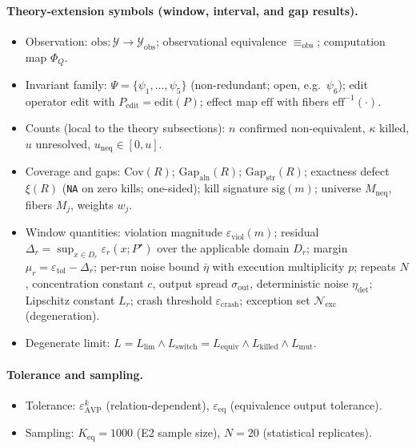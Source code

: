 \documentclass[review,12pt,authoryear]{elsarticle}
\begin{document}
\paragraph{Theory-extension symbols (window, interval, and gap results).}
\begin{itemize}
\item Observation: $\mathrm{obs} : \mathcal{Y} \to \mathcal{Y}_{\mathrm{obs}}$; observational equivalence $\equiv_{\mathrm{obs}}$; computation map $\Phi_Q$.
\item Invariant family: $\Psi = \{\psi_1, \dots, \psi_5\}$ (non-redundant; open, e.g.\ $\psi_6$); edit operator $\mathrm{edit}$ with $P_{\mathrm{edit}} = \mathrm{edit}(P)$; effect map $\mathrm{eff}$ with fibers $\mathrm{eff}^{-1}(\cdot)$.
\item Counts (local to the theory subsections): $n$ confirmed non-equivalent, $\kappa$ killed, $u$ unresolved, $u_{\mathrm{neq}} \in [0, u]$.
\item Coverage and gaps: $\mathrm{Cov}(R)$; $\mathrm{Gap}_{\mathrm{aln}}(R)$; $\mathrm{Gap}_{\mathrm{str}}(R)$; exactness defect $\xi(R)$ (\texttt{NA} on zero kills; one-sided); kill signature $\mathrm{sig}(m)$; universe $M_{\mathrm{neq}}$, fibers $M_j$, weights $w_j$.
\item Window quantities: violation magnitude $\varepsilon_{\mathrm{viol}}(m)$; residual $\Delta_r = \sup_{x \in D_r} \varepsilon_r(x; P^\star)$ over the applicable domain $D_r$; margin $\mu_r = \varepsilon_{\mathrm{tol}} - \Delta_r$; per-run noise bound $\bar\eta$ with execution multiplicity $p$; repeats $N$, concentration constant $c$, output spread $\sigma_{\mathrm{out}}$, deterministic noise $\eta_{\mathrm{det}}$; Lipschitz constant $L_r$; crash threshold $\varepsilon_{\mathrm{crash}}$; exception set $\mathcal{N}_{\mathrm{exc}}$ (degeneration).
\item Degenerate limit: $L = L_{\mathrm{lim}} \wedge L_{\mathrm{switch}} = L_{\mathrm{equiv}} \wedge L_{\mathrm{killed}} \wedge L_{\mathrm{mut}}$.
\end{itemize}

\paragraph{Tolerance and sampling.}
\begin{itemize}
\item Tolerance: $\varepsilon_{\mathrm{AVP}}^k$ (relation-dependent), $\varepsilon_{\mathrm{eq}}$ (equivalence output tolerance).
\item Sampling: $K_{\mathrm{eq}} = 1000$ (E2 sample size), $N = 20$ (statistical replicates).
\end{itemize}
\end{document}

